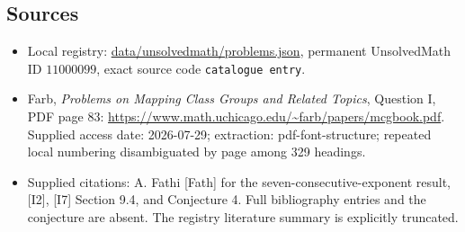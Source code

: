 \documentclass[11pt]{article}
\begin{document}
\subsection{Sources}
\begin{itemize}
\item Local registry: \url{data/unsolvedmath/problems.json}, permanent UnsolvedMath ID $11000099$, exact source code \texttt{catalogue entry}.
\item Farb, \emph{Problems on Mapping Class Groups and Related Topics}, Question I, PDF page 83: \url{https://www.math.uchicago.edu/~farb/papers/mcgbook.pdf}. Supplied access date: 2026-07-29; extraction: pdf-font-structure; repeated local numbering disambiguated by page among 329 headings.
\item Supplied citations: A. Fathi [Fath] for the seven-consecutive-exponent result, [I2], [I7] Section 9.4, and Conjecture 4. Full bibliography entries and the conjecture are absent. The registry literature summary is explicitly truncated.
\end{itemize}
\end{document}

